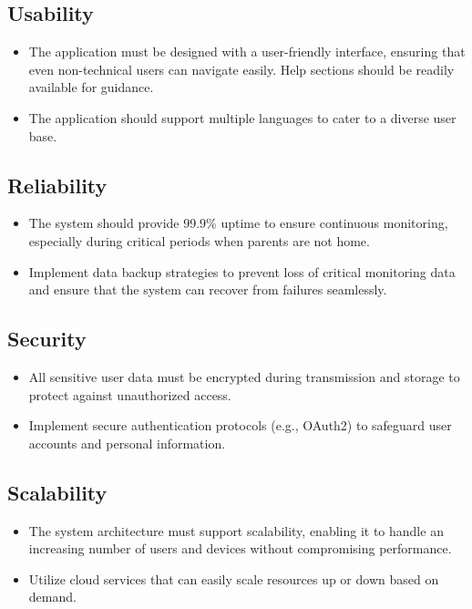 \documentclass[12pt,a4paper]{report}
\begin{document}
\subsection{Usability}
\begin{itemize}
  \item The application must be designed with a user-friendly interface, ensuring that even non-technical users can navigate easily. Help sections should be readily available for guidance.
  \item The application should support multiple languages to cater to a diverse user base.
\end{itemize}

\subsection{Reliability}
\begin{itemize}
  \item The system should provide 99.9\% uptime to ensure continuous monitoring, especially during critical periods when parents are not home.
  \item Implement data backup strategies to prevent loss of critical monitoring data and ensure that the system can recover from failures seamlessly.
\end{itemize}

\subsection{Security}
\begin{itemize}
  \item All sensitive user data must be encrypted during transmission and storage to protect against unauthorized access.
  \item Implement secure authentication protocols (e.g., OAuth2) to safeguard user accounts and personal information.
\end{itemize}

\subsection{Scalability}
\begin{itemize}
  \item The system architecture must support scalability, enabling it to handle an increasing number of users and devices without compromising performance.
  \item Utilize cloud services that can easily scale resources up or down based on demand.
\end{itemize}
\end{document}

